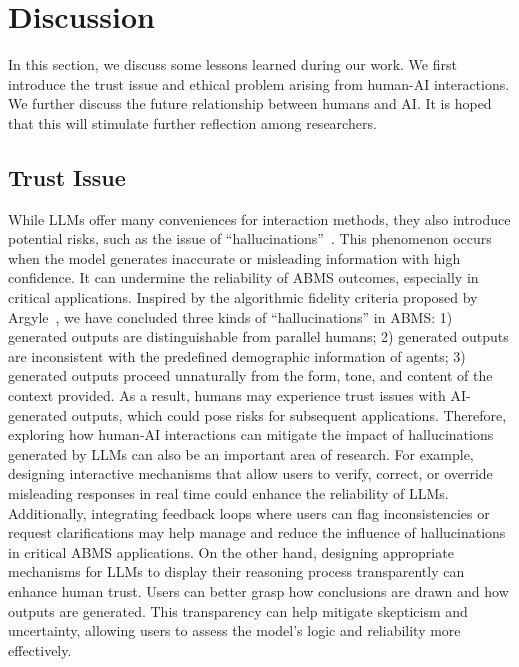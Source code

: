 
\section{Discussion}
In this section, we discuss some lessons learned during our work. 
We first introduce the trust issue and ethical problem arising from human-AI interactions.
We further discuss the future relationship between humans and AI.
It is hoped that this will stimulate further reflection among researchers.

\subsection{Trust Issue}
While LLMs offer many conveniences for interaction methods, they also introduce potential risks, such as the issue of ``hallucinations''~\cite{yao2024llmlieshallucinationsbugs}. %
This phenomenon occurs when the model generates inaccurate or misleading information with high confidence. It can undermine the reliability of ABMS outcomes, especially in critical applications.
Inspired by the algorithmic fidelity criteria proposed by Argyle\etal~\cite{Argyle_Busby_Fulda_Gubler_Rytting_Wingate_2023}, we have concluded three kinds of ``hallucinations'' in ABMS: 1)  generated outputs are distinguishable from parallel humans; 2) generated outputs are inconsistent with the predefined demographic information of agents; 3) generated outputs proceed unnaturally from the form, tone, and content of the context provided.
As a result, humans may experience trust issues with AI-generated outputs, which could pose risks for subsequent applications.
Therefore, exploring how human-AI interactions can mitigate the impact of hallucinations generated by LLMs can also be an important area of research.
For example, designing interactive mechanisms that allow users to verify, correct, or override misleading responses in real time could enhance the reliability of LLMs. 
Additionally, integrating feedback loops where users can flag inconsistencies or request clarifications may help manage and reduce the influence of hallucinations in critical ABMS applications.
On the other hand, designing appropriate mechanisms for LLMs to display their reasoning process transparently can enhance human trust.
Users can better grasp how conclusions are drawn and how outputs are generated. 
This transparency can help mitigate skepticism and uncertainty, allowing users to assess the model's logic and reliability more effectively.

